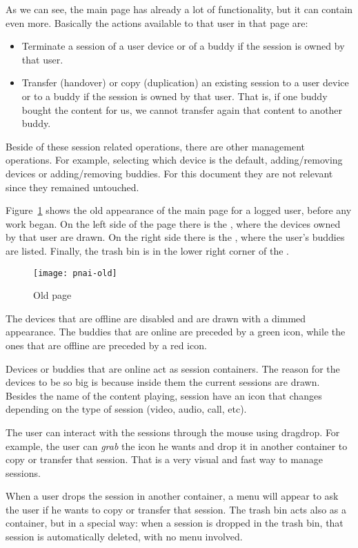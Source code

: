 As we can see, the main  page has already a lot of functionality, but it can contain even more. Basically the actions available to that user in that page are:

\begin{itemize}
  \item Terminate a session of a user device or of a buddy if the session is owned by that user.
  \item Transfer (handover) or copy (duplication) an existing session to a user device or to a buddy if the session is owned by that user. That is, if one buddy bought the content for us, we cannot transfer again that content to another buddy.
\end{itemize}

Beside of these session related operations, there are other management operations.
For example, selecting which device is the default, adding/removing devices or adding/removing buddies.
For this document they are not relevant since they remained untouched.

Figure~\ref{fig:pnai-old} shows the old appearance of the main page for a logged user, before any work began.
On the left side of the page there is the , where the devices owned by that user are drawn.
On the right side there is the , where the user's buddies are listed.
Finally, the trash bin is in the lower right corner of the . 

\begin{figure}[htbp]
  \centering
    \texttt{[image: pnai-old]}
  \caption{Old  page}
  \label{fig:pnai-old}
\end{figure}

The devices that are offline are disabled and are drawn with a dimmed appearance.
The buddies that are online are preceded by a green icon, while the ones that are offline are preceded by a red icon.

Devices or buddies that are online act as session containers.
The reason for the devices to be so big is because inside them the current sessions are drawn.
Besides the name of the content playing, session have an icon that changes depending on the type of session (video, audio, call, etc).

The user can interact with the sessions through the mouse using drag\et{}drop.
For example, the user can \emph{grab} the icon he wants and drop it in another container to copy or transfer that session.
That is a very visual and fast way to manage sessions.

When a user drops the session in another container, a menu will appear to ask the user if he wants to copy or transfer that session.
The trash bin acts also as a container, but in a special way: when a session is dropped in the trash bin, that session is automatically deleted, with no menu involved.







